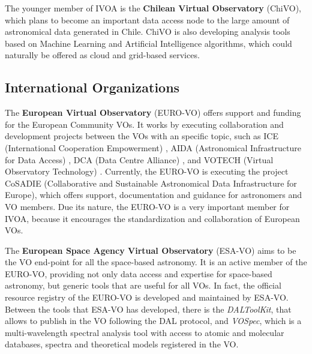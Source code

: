 The younger member of IVOA is the \textbf{Chilean Virtual Observatory} (ChiVO),
which plans to become an important data access node to the large amount
of astronomical data generated in Chile. ChiVO is also developing analysis
tools based on Machine Learning and Artificial Intelligence algorithms,
which could naturally be offered as cloud and grid-based services.

\subsection{International Organizations}

The \textbf{European Virtual Observatory} (EURO-VO) offers support and funding
for the European Community VOs.  It works by executing collaboration and
development projects between the VOs with an specific topic, such as ICE
(International Cooperation Empowerment) \cite{},
AIDA (Astronomical Infrastructure for Data Access) \cite{},
DCA (Data Centre Alliance) \cite{}, and
VOTECH (Virtual Observatory Technology) \cite{}.
Currently, the EURO-VO is executing the project CoSADIE (Collaborative and
Sustainable Astronomical Data Infrastructure for Europe), which offers 
support, documentation and guidance for astronomers and VO members.
Due its nature, the EURO-VO is a very important member for IVOA, because
it encourages the standardization and collaboration of European VOs.

The \textbf{European Space Agency Virtual Observatory} (ESA-VO) aims to be the
VO end-point for all the space-based astronomy.  It is an active member of the
EURO-VO, providing not only data access and expertise for space-based astronomy,
but generic tools that are useful for all VOs. In fact, the official resource
registry of the EURO-VO is developed and maintained by ESA-VO. 
Between the tools that ESA-VO has developed, there is the \emph{DALToolKit},
that allows to publish in the VO following the DAL protocol, and \emph{VOSpec},
which is a multi-wavelength spectral analysis tool with access to atomic and
molecular databases, spectra and theoretical models registered in the VO.

